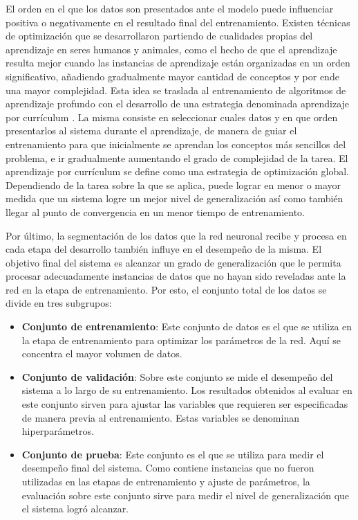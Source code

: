El orden en el que los datos son presentados ante el modelo puede influenciar positiva o negativamente en el resultado final del entrenamiento. Existen técnicas de optimización que se desarrollaron partiendo de cualidades propias del aprendizaje en seres humanos y animales, como el hecho de que el aprendizaje resulta mejor cuando las instancias de aprendizaje están organizadas en un orden significativo, añadiendo gradualmente mayor cantidad de conceptos y por ende una mayor complejidad. Esta idea se traslada al entrenamiento de algoritmos de aprendizaje profundo con el desarrollo de una estrategia denominada aprendizaje por currículum \cite{cv}. La misma consiste en seleccionar cuales datos y en que orden presentarlos al sistema durante el aprendizaje, de manera de guiar el entrenamiento para que inicialmente se aprendan los conceptos más sencillos del problema, e ir gradualmente aumentando el grado de complejidad de la tarea. El aprendizaje por currículum se define como una estrategia de optimización global. Dependiendo de la tarea sobre la que se aplica, puede lograr en menor o mayor medida que un sistema logre un mejor nivel de generalización así como también llegar al punto de convergencia en un menor tiempo de entrenamiento.


Por último, la segmentación de los datos que la red neuronal recibe y procesa en cada etapa del desarrollo también influye en el desempeño de la misma. El objetivo final del sistema es alcanzar un grado de generalización que le permita procesar adecuadamente instancias de datos que no hayan sido reveladas ante la red en la etapa de entrenamiento. Por esto, el conjunto total de los datos se divide en tres subgrupos: 

\begin{itemize}
\item\textbf{Conjunto de entrenamiento}: Este conjunto de datos es el que se utiliza en la etapa de entrenamiento para optimizar los parámetros de la red. Aquí se concentra el mayor volumen de datos.

\item\textbf{Conjunto de validación}: Sobre este conjunto se mide el desempeño del sistema a lo largo de su entrenamiento. Los resultados obtenidos al evaluar en este conjunto sirven para ajustar las variables que requieren ser especificadas de manera previa al entrenamiento. Estas variables se denominan hiperparámetros.
 
\item\textbf{Conjunto de prueba}: Este conjunto es el que se utiliza para medir el desempeño final del sistema. Como contiene instancias que no fueron utilizadas en las etapas de entrenamiento y ajuste de parámetros, la evaluación sobre este conjunto sirve para medir el nivel de generalización que el sistema logró alcanzar. 

\end{itemize}


